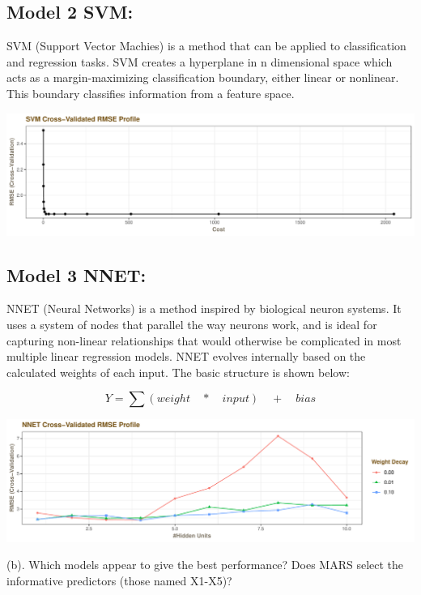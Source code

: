 \documentclass[]{report}
\begin{document}
\subsection{Model 2 SVM:}\label{model-2-svm}

SVM (Support Vector Machies) is a method that can be applied to
classification and regression tasks. SVM creates a hyperplane in n
dimensional space which acts as a margin-maximizing classification
boundary, either linear or nonlinear. This boundary classifies
information from a feature space.

\includegraphics{AppliedPredictiveModeling_treebased_regression_files/figure-latex/kj-7.2-2-1.pdf}

\subsection{Model 3 NNET:}\label{model-3-nnet}

NNET (Neural Networks) is a method inspired by biological neuron
systems. It uses a system of nodes that parallel the way neurons work,
and is ideal for capturing non-linear relationships that would otherwise
be complicated in most multiple linear regression models. NNET evolves
internally based on the calculated weights of each input. The basic
structure is shown below:

\[
Y=\sum { (weight\quad *\quad input)\quad +\quad bias } 
\]

\includegraphics{AppliedPredictiveModeling_treebased_regression_files/figure-latex/kj-7.2-3-1.pdf}

\begin{subquestion}{(b).}
Which models appear to give the best performance? Does MARS select the informative predictors (those named X1-X5)?
\end{subquestion}
\end{document}
